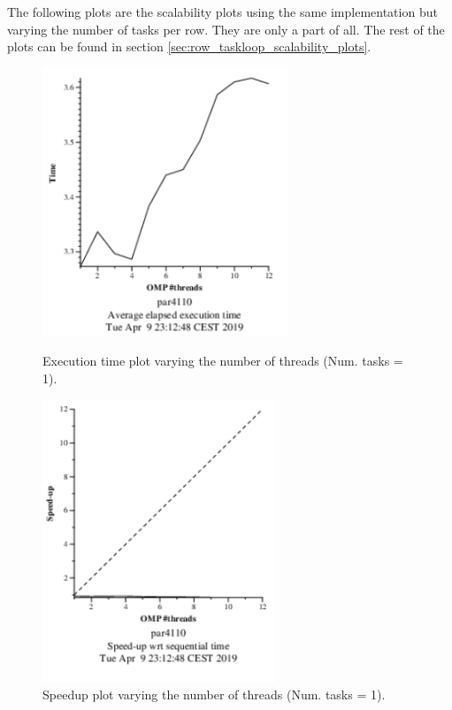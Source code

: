\documentclass[12pt, a4paper]{article}
\begin{document}
The following plots are the scalability plots using the same implementation but varying the number of tasks per row. They are only a part of all. The rest of the plots can be found in section \ref{sec:row_taskloop_scalability_plots}.


\begin{figure}[H]
\centering
\begin{minipage}[t]{0.4\linewidth}
  \centering
  \includegraphics[scale=1.5]{./mandel-omp-10000-strong-omp-3-1-time}
  \caption{Execution time plot varying the number of threads (Num. tasks = 1).}
  \label{fig:mandel-omp-10000-strong-omp-3-1-time}
\end{minipage}%
\hspace{0.5cm}
\begin{minipage}[t]{0.4\linewidth}
  \centering
  \includegraphics[scale=1.5]{./mandel-omp-10000-strong-omp-3-1-speedup}
  \caption{Speedup plot varying the number of threads (Num. tasks = 1).}
  \label{fig:mandel-omp-10000-strong-omp-3-1-speedup}
\end{minipage}
\end{figure}
\end{document}
